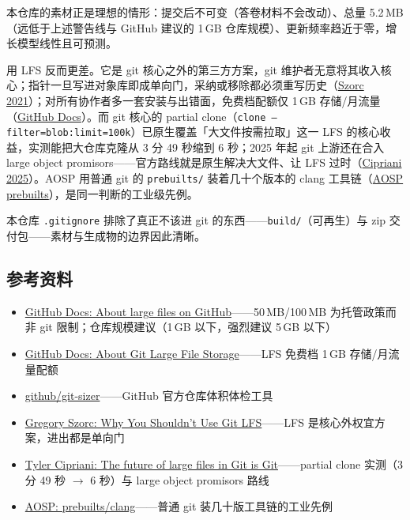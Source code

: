 \documentclass[a4paper, 12pt, linespread=1.35]{ctexart}   %
\begin{document}
本仓库的素材正是理想的情形：提交后不可变（答卷材料不会改动）、总量 5.2\,MB（远低于上述警告线与 GitHub 建议的 1\,GB 仓库规模）、更新频率趋近于零，增长模型线性且可预测。

用 LFS 反而更差。它是 git 核心之外的第三方方案，git 维护者无意将其收入核心；指针一旦写进对象库即成单向门，采纳或移除都必须重写历史（\href{https://gregoryszorc.com/blog/2021/05/12/why-you-shouldnt-use-git-lfs}{Szorc 2021}）；对所有协作者多一套安装与出错面，免费档配额仅 1\,GB 存储/月流量（\href{https://docs.github.com/en/repositories/working-with-files/using-large-files/about-git-large-file-storage}{GitHub Docs}）。而 git 核心的 partial clone（\texttt{clone --filter=blob:limit=100k}）已原生覆盖「大文件按需拉取」这一 LFS 的核心收益，实测能把大仓库克隆从 3 分 49 秒缩到 6 秒；2025 年起 git 上游还在合入 large object promisors——官方路线就是原生解决大文件、让 LFS 过时（\href{https://tylercipriani.com/blog/2025/08/15/git-lfs/}{Cipriani 2025}）。AOSP 用普通 git 的 \texttt{prebuilts/} 装着几十个版本的 clang 工具链（\href{https://android.googlesource.com/platform/prebuilts/clang/host/linux-x86}{AOSP prebuilts}），是同一判断的工业级先例。

本仓库 \texttt{.gitignore} 排除了真正不该进 git 的东西——\texttt{build/}（可再生）与 zip 交付包——素材与生成物的边界因此清晰。

\subsection{参考资料}

\begin{itemize}
  \item \href{https://docs.github.com/en/repositories/working-with-files/managing-large-files/about-large-files-on-github}{GitHub Docs: About large files on GitHub}——50\,MB/100\,MB 为托管政策而非 git 限制；仓库规模建议（1\,GB 以下，强烈建议 5\,GB 以下）
  \item \href{https://docs.github.com/en/repositories/working-with-files/using-large-files/about-git-large-file-storage}{GitHub Docs: About Git Large File Storage}——LFS 免费档 1\,GB 存储/月流量配额
  \item \href{https://github.com/github/git-sizer}{github/git-sizer}——GitHub 官方仓库体积体检工具
  \item \href{https://gregoryszorc.com/blog/2021/05/12/why-you-shouldnt-use-git-lfs}{Gregory Szorc: Why You Shouldn't Use Git LFS}——LFS 是核心外权宜方案，进出都是单向门
  \item \href{https://tylercipriani.com/blog/2025/08/15/git-lfs/}{Tyler Cipriani: The future of large files in Git is Git}——partial clone 实测（3 分 49 秒 $\rightarrow$ 6 秒）与 large object promisors 路线
  \item \href{https://android.googlesource.com/platform/prebuilts/clang/host/linux-x86}{AOSP: prebuilts/clang}——普通 git 装几十版工具链的工业先例
\end{itemize}


\end{document}
